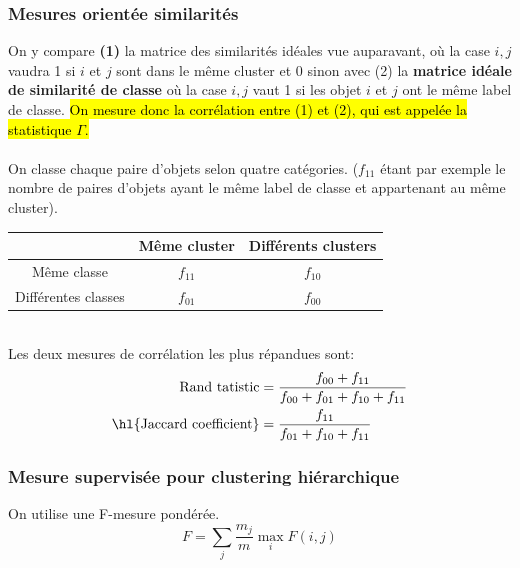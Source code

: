 \documentclass[letterpaper, 12pt]{article}
\newcommand{\alinea}{
\hspace*{0.5cm}}
\begin{document}
			\subsubsection{Mesures orientée similarités}
				\alinea On y compare \textbf{(1)} 
					la matrice des similarités idéales
					vue auparavant, où la case $i, j$ 
					vaudra 1 si $i$ et $j$ sont dans le
					même cluster et 0 sinon avec (2) la \textbf{matrice
					idéale de similarité de classe} où la case
					$i, j$ vaut 1 si les objet $i$ et $j$ ont
					le même label de classe. \hl{On mesure donc la 
					corrélation entre (1) et (2), qui est appelée 
					la statistique $\Gamma$.}\\
				~\\
				On classe chaque paire d'objets selon quatre catégories.
				($f_{11}$ étant par exemple le nombre de paires d'objets
				ayant le même label de classe et appartenant au même 
				cluster).\\
				\begin{center}
				\begin{tabular}{|c|c|c|}
				\hline
				                    & Même cluster & Différents clusters\\
				\hline
				Même classe         &    $f_{11}$  &       $f_{10}$     \\
				\hline				
				Différentes classes &    $f_{01}$  &       $f_{00}$     \\
				\hline
				\end{tabular}
				\end{center}~\\
				Les deux mesures de corrélation les plus répandues sont:
				\begin{align*}
					\text{Rand tatistic} &= \frac{f_{00} + f_{11}}%
						{f_{00} + f_{01} + f_{10} + f_{11}}\\
					\text{\hl{Jaccard coefficient}} &= \frac{f_{11}}{f_{01} + 
						f_{10} + f_{11}}
				\end{align*}
			\subsubsection{Mesure supervisée pour clustering hiérarchique}
				\alinea On utilise une F-mesure pondérée.
				$$ F = \sum_{j} \frac{m_j}{m} \max_{i} F(i, j) $$
\end{document}
